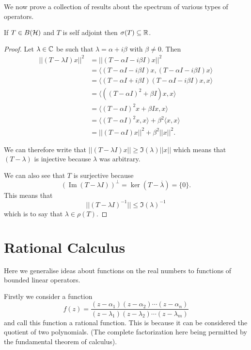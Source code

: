\documentclass{unswmaths}
\begin{document}
We now prove a collection of results about the spectrum of various types of operators.

\begin{theorem}
	If $ T \in B(\mathcal{H}) $ and $ T $ is self adjoint then $ \sigma(T) \subseteq \mathbb{R} $.
\end{theorem}
\begin{proof}
	Let $ \lambda \in \mathbb{C} $ be such that $ \lambda = \alpha + i \beta $ with $ \beta \neq 0 $.
	Then 
	\begin{align*}
		||(T - \lambda I)x||^2 &= ||( T - \alpha I - i \beta I)x||^2 \\
			&= \langle (T - \alpha I - i \beta I)x, (T - \alpha I - i \beta I)x \rangle \\
			&= \langle (T - \alpha I + i \beta I) (T - \alpha I - i \beta I)x,x \rangle \\
			&= \langle \left((T - \alpha I)^2 + \beta I \right)x,x \rangle \\
			&= \langle (T - \alpha I)^2x + \beta Ix ,x \rangle \\
			&= \langle (T - \alpha I)^2 x, x \rangle + \beta^2 \langle x, x\rangle \\
			&= ||(T-\alpha I)x||^2 + \beta^2 ||x||^2.
	\end{align*}
	
	We can therefore write that $ || (T- \lambda I)x || \geq \Im(\lambda)||x|| $ which means that
	$ (T - \lambda) $ is injective because $ \lambda $ was arbitrary.
	
	We can also see that $ T $ is surjective because
	$$
		\left(\operatorname{Im}(T - \lambda I)\right)^\perp = \ker(T - \overline{\lambda}) = \{ 0 \}.
	$$
	This means that $$ || (T - \lambda I)^{-1} || \leq \Im(\lambda)^{-1} $$ which is to say that 
	$ \lambda \in \rho(T) $.
\end{proof}

\section*{Rational Calculus}
Here we generalise ideas about functions on the real numbers to functions of bounded linear operators.

Firstly we consider a function 
$$
	f(z) = \frac{(z-\alpha_1) (z - \alpha_2) \cdots (z - \alpha_n)}{(z - \lambda_1) (z- \lambda_2) \cdots (z - \lambda_m)}
$$
and call this function a rational function. This is because it can be considered the quotient of two polynomials. (The complete factorization here being
permitted by the fundamental theorem of calculus).
\end{document}
